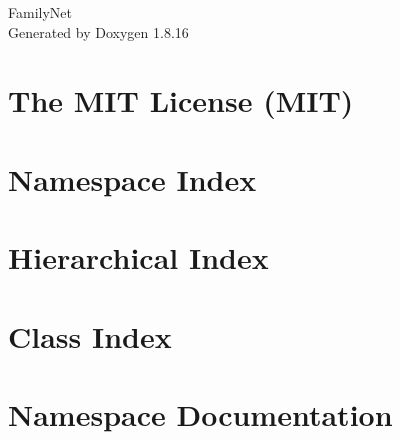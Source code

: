 \let\mypdfximage\pdfximage\def\pdfximage{\immediate\mypdfximage}\documentclass[twoside]{book}
\newcommand{\+}{\discretionary{\mbox{\scriptsize$\hookleftarrow$}}{}{}}
\newcommand{\clearemptydoublepage}{%
  \newpage{\pagestyle{empty}\cleardoublepage}%
}
\begin{document}
\hypersetup{pageanchor=false,
             bookmarksnumbered=true,
             pdfencoding=unicode
            }
\begin{titlepage}
\vspace*{7cm}
\begin{center}%
{\Large Family\+Net }\\
\vspace*{1cm}
{\large Generated by Doxygen 1.8.16}\\
\end{center}
\end{titlepage}
\clearemptydoublepage
{}
\tableofcontents
\clearemptydoublepage
{}
\hypersetup{pageanchor=true}

\chapter{The M\+IT License (M\+IT)}
\label{md__c_1__users_alter__one_drive__xD0_xA0_xD0_xB0_xD0_xB1_xD0_xBE_xD1_x87_xD0_xB8_xD0_xB9__xD1_x883d1600b6c473489c1e841a00bd203c6}

\chapter{Namespace Index}

\chapter{Hierarchical Index}

\chapter{Class Index}

\chapter{Namespace Documentation}











\end{document}
